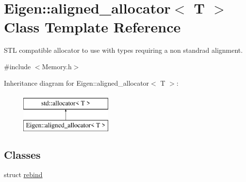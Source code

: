 \hypertarget{class_eigen_1_1aligned__allocator}{}\section{Eigen\+::aligned\+\_\+allocator$<$ T $>$ Class Template Reference}
\label{class_eigen_1_1aligned__allocator}


S\+TL compatible allocator to use with types requiring a non standrad alignment.  




{\ttfamily \#include $<$Memory.\+h$>$}

Inheritance diagram for Eigen\+::aligned\+\_\+allocator$<$ T $>$\+:\begin{figure}[H]
\begin{center}
\leavevmode
\includegraphics[height=2.000000cm]{class_eigen_1_1aligned__allocator}
\end{center}
\end{figure}
\subsection*{Classes}
\begin{DoxyCompactItemize}
\item 
struct \mbox{\hyperlink{struct_eigen_1_1aligned__allocator_1_1rebind}{rebind}}
\end{DoxyCompactItemize}
